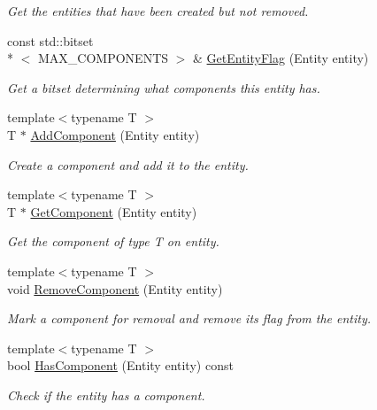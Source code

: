 \begin{DoxyCompactItemize}
\begin{DoxyCompactList}\small\item\em Get the entities that have been created but not removed. \end{DoxyCompactList}\item 
const std\-::bitset\\*
$<$ M\-A\-X\-\_\-\-C\-O\-M\-P\-O\-N\-E\-N\-T\-S $>$ \& \hyperlink{class_e_c_s_1_1_entity_manager_a99e073bee7f9210e6e13ad7373d9700f}{Get\-Entity\-Flag} (Entity entity)
\begin{DoxyCompactList}\small\item\em Get a bitset determining what components this entity has. \end{DoxyCompactList}\item 
{\footnotesize template$<$typename T $>$ }\\T $\ast$ \hyperlink{class_e_c_s_1_1_entity_manager_a735ab328f07b45342c392fe1f1b6f925}{Add\-Component} (Entity entity)
\begin{DoxyCompactList}\small\item\em Create a component and add it to the entity. \end{DoxyCompactList}\item 
{\footnotesize template$<$typename T $>$ }\\T $\ast$ \hyperlink{class_e_c_s_1_1_entity_manager_a7ee27d400563107f222693fb103c21ed}{Get\-Component} (Entity entity)
\begin{DoxyCompactList}\small\item\em Get the component of type T on entity. \end{DoxyCompactList}\item 
{\footnotesize template$<$typename T $>$ }\\void \hyperlink{class_e_c_s_1_1_entity_manager_a78ee8abb53ca6a324496ea839503ac3f}{Remove\-Component} (Entity entity)
\begin{DoxyCompactList}\small\item\em Mark a component for removal and remove its flag from the entity. \end{DoxyCompactList}\item 
{\footnotesize template$<$typename T $>$ }\\bool \hyperlink{class_e_c_s_1_1_entity_manager_a15d62c8ffa5a48a7c56b32b40e8ed3b8}{Has\-Component} (Entity entity) const 
\begin{DoxyCompactList}\small\item\em Check if the entity has a component. \end{DoxyCompactList}\item 

\end{DoxyCompactItemize}
